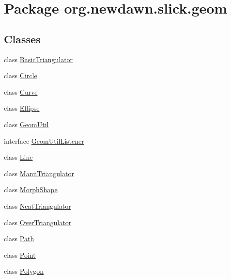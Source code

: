 \hypertarget{namespaceorg_1_1newdawn_1_1slick_1_1geom}{}\section{Package org.\+newdawn.\+slick.\+geom}
\label{namespaceorg_1_1newdawn_1_1slick_1_1geom}
\subsection*{Classes}
\begin{DoxyCompactItemize}
\item 
class \mbox{\hyperlink{classorg_1_1newdawn_1_1slick_1_1geom_1_1_basic_triangulator}{Basic\+Triangulator}}
\item 
class \mbox{\hyperlink{classorg_1_1newdawn_1_1slick_1_1geom_1_1_circle}{Circle}}
\item 
class \mbox{\hyperlink{classorg_1_1newdawn_1_1slick_1_1geom_1_1_curve}{Curve}}
\item 
class \mbox{\hyperlink{classorg_1_1newdawn_1_1slick_1_1geom_1_1_ellipse}{Ellipse}}
\item 
class \mbox{\hyperlink{classorg_1_1newdawn_1_1slick_1_1geom_1_1_geom_util}{Geom\+Util}}
\item 
interface \mbox{\hyperlink{interfaceorg_1_1newdawn_1_1slick_1_1geom_1_1_geom_util_listener}{Geom\+Util\+Listener}}
\item 
class \mbox{\hyperlink{classorg_1_1newdawn_1_1slick_1_1geom_1_1_line}{Line}}
\item 
class \mbox{\hyperlink{classorg_1_1newdawn_1_1slick_1_1geom_1_1_mann_triangulator}{Mann\+Triangulator}}
\item 
class \mbox{\hyperlink{classorg_1_1newdawn_1_1slick_1_1geom_1_1_morph_shape}{Morph\+Shape}}
\item 
class \mbox{\hyperlink{classorg_1_1newdawn_1_1slick_1_1geom_1_1_neat_triangulator}{Neat\+Triangulator}}
\item 
class \mbox{\hyperlink{classorg_1_1newdawn_1_1slick_1_1geom_1_1_over_triangulator}{Over\+Triangulator}}
\item 
class \mbox{\hyperlink{classorg_1_1newdawn_1_1slick_1_1geom_1_1_path}{Path}}
\item 
class \mbox{\hyperlink{classorg_1_1newdawn_1_1slick_1_1geom_1_1_point}{Point}}
\item 
class \mbox{\hyperlink{classorg_1_1newdawn_1_1slick_1_1geom_1_1_polygon}{Polygon}}
\item 

\end{DoxyCompactItemize}
